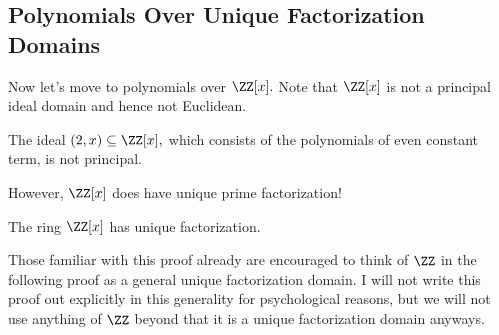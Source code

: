 \subsection{Polynomials Over Unique Factorization Domains}
Now let's move to polynomials over $\ZZ[x].$ Note that $\ZZ[x]$ is not a principal ideal domain and hence not Euclidean.
\begin{example}
	The ideal $(2,x)\subseteq\ZZ[x],$ which consists of the polynomials of even constant term, is not principal.
\end{example}
However, $\ZZ[x]$ does have unique prime factorization!
\begin{theorem} \label{thm:zxufd}
	The ring $\ZZ[x]$ has unique factorization.
\end{theorem}
\begin{remark}[Nir]
	Those familiar with this proof already are encouraged to think of $\ZZ$ in the following proof as a general unique factorization domain. I will not write this proof out explicitly in this generality for psychological reasons, but we will not use anything of $\ZZ$ beyond that it is a unique factorization domain anyways.
\end{remark}

